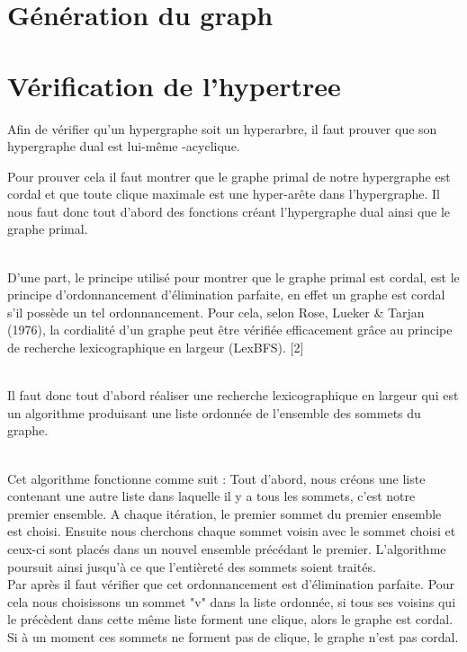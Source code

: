 \documentclass[a4paper]{report}
\begin{document}
\section{Génération du graph}

\section{Vérification de l'hypertree}

Afin de vérifier qu’un hypergraphe soit un hyperarbre, il faut prouver que son hypergraphe dual est lui-même 
\alpha -acyclique. 

Pour prouver cela il faut montrer que le graphe primal de notre hypergraphe est cordal et que toute clique maximale est une hyper-arête dans l’hypergraphe.
Il nous faut donc tout d’abord des fonctions créant l’hypergraphe dual ainsi que le graphe primal.

\\D'une part, le principe utilisé pour montrer que le graphe primal est cordal, est le principe d’ordonnancement d’élimination parfaite, en effet un graphe est cordal s’il possède un tel ordonnancement.
Pour cela, selon Rose, Lueker & Tarjan (1976), la cordialité d’un graphe peut être vérifiée efficacement grâce au principe de recherche lexicographique en largeur (LexBFS). [2]

\\Il faut donc tout d’abord réaliser une recherche lexicographique en largeur qui est un algorithme produisant une liste ordonnée de l’ensemble des sommets du graphe.

\\Cet algorithme fonctionne comme suit : Tout d'abord, nous créons une liste contenant une autre liste dans laquelle il y a tous les sommets, c'est notre premier ensemble. A chaque itération, le premier sommet du premier ensemble est choisi. Ensuite nous cherchons chaque sommet voisin avec le sommet choisi et ceux-ci sont placés dans un nouvel ensemble précédant le premier. L’algorithme poursuit ainsi jusqu’à ce que l’entièreté des sommets soient traités.
\\Par après il faut vérifier que cet ordonnancement est d’élimination parfaite. Pour cela nous choisissons un sommet "v" dans la liste ordonnée, si tous ses voisins qui le précèdent dans cette même liste forment une clique, alors le graphe est cordal. Si à un moment ces sommets ne forment pas de clique, le graphe n’est pas cordal.
\end{document}

